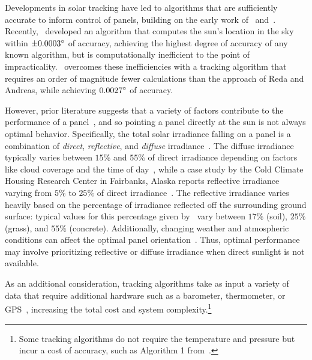 \documentclass{article}
\begin{document}
Developments in solar tracking have led to algorithms that are sufficiently accurate to inform control of panels, building on the early work of~\citet{spencer1971fourier,walraven1978calculating} and~\citet{michalsky1988astronomical}. Recently,~\citet{reda2004solar} developed an algorithm that computes the sun's location in the sky within $\pm 0.0003\degree$ of accuracy, achieving the highest degree of accuracy of any known algorithm, but is computationally inefficient to the point of impracticality.~\citet{Grena2008} overcomes these inefficiencies with a tracking algorithm that requires an order of magnitude fewer calculations than the approach of Reda and Andreas, while achieving $0.0027\degree$ of accuracy.

However, prior literature suggests that a variety of factors contribute to the performance of a panel~\cite{King2001}, and so pointing a panel directly at the sun is not always optimal behavior. Specifically, the total solar irradiance falling on a panel is a combination of {\it direct}, {\it reflective}, and {\it diffuse} irradiance~\cite{Benghanem2011}. The diffuse irradiance typically varies between $15\%$ and $55\%$ of direct irradiance depending on factors like cloud coverage and the time of day~\cite{peterson1981ratio}, while a case study by the Cold Climate Housing Research Center in Fairbanks, Alaska reports reflective irradiance varying from $5\%$ to $25\%$ of direct irradiance~\cite{colgan2010}. The reflective irradiance varies heavily based on the percentage of irradiance reflected off the surrounding ground surface: typical values for this percentage given by~\citet{mcevoy2003practical} vary between $17\%$ (soil), $25\%$ (grass), and $55\%$ (concrete). Additionally, changing weather and atmospheric conditions can affect the optimal panel orientation~\cite{Kelly2009}. Thus, optimal performance may involve prioritizing reflective or diffuse irradiance when direct sunlight is not available.

As an additional consideration, tracking algorithms take as input a variety of data that require additional hardware such as a barometer, thermometer, or GPS~\cite{Grena2012}, increasing the total cost and system complexity.\footnote{Some tracking algorithms do not require the temperature and pressure but incur a cost of accuracy, such as Algorithm 1 from~\citet{Grena2012}.}
\end{document}
